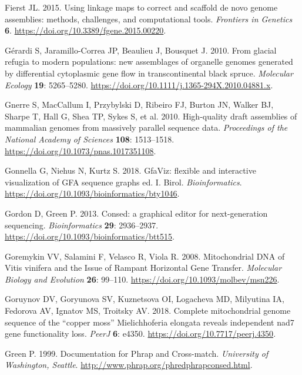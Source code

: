 \documentclass[
  12pt,
  oneside,
  openany]{book}
\begin{document}
\leavevmode\hypertarget{ref-Fierst_2015}{}%
Fierst JL. 2015. Using linkage maps to correct and scaffold de novo genome assemblies: methods, challenges, and computational tools. \emph{Frontiers in Genetics} \textbf{6}. \url{https://doi.org/10.3389/fgene.2015.00220}.

\leavevmode\hypertarget{ref-Gerardi_2010}{}%
Gérardi S, Jaramillo-Correa JP, Beaulieu J, Bousquet J. 2010. From glacial refugia to modern populations: new assemblages of organelle genomes generated by differential cytoplasmic gene flow in transcontinental black spruce. \emph{Molecular Ecology} \textbf{19}: 5265--5280. \url{https://doi.org/10.1111/j.1365-294X.2010.04881.x}.

\leavevmode\hypertarget{ref-Gnerre_2010}{}%
Gnerre S, MacCallum I, Przybylski D, Ribeiro FJ, Burton JN, Walker BJ, Sharpe T, Hall G, Shea TP, Sykes S, et al. 2010. High-quality draft assemblies of mammalian genomes from massively parallel sequence data. \emph{Proceedings of the National Academy of Sciences} \textbf{108}: 1513--1518. \url{https://doi.org/10.1073/pnas.1017351108}.

\leavevmode\hypertarget{ref-Gonnella_2018}{}%
Gonnella G, Niehus N, Kurtz S. 2018. GfaViz: flexible and interactive visualization of GFA sequence graphs ed. I. Birol. \emph{Bioinformatics}. \url{https://doi.org/10.1093/bioinformatics/bty1046}.

\leavevmode\hypertarget{ref-Gordon_2013}{}%
Gordon D, Green P. 2013. Consed: a graphical editor for next-generation sequencing. \emph{Bioinformatics} \textbf{29}: 2936--2937. \url{https://doi.org/10.1093/bioinformatics/btt515}.

\leavevmode\hypertarget{ref-Goremykin_2008}{}%
Goremykin VV, Salamini F, Velasco R, Viola R. 2008. Mitochondrial DNA of Vitis vinifera and the Issue of Rampant Horizontal Gene Transfer. \emph{Molecular Biology and Evolution} \textbf{26}: 99--110. \url{https://doi.org/10.1093/molbev/msn226}.

\leavevmode\hypertarget{ref-Goruynov_2018}{}%
Goruynov DV, Goryunova SV, Kuznetsova OI, Logacheva MD, Milyutina IA, Fedorova AV, Ignatov MS, Troitsky AV. 2018. Complete mitochondrial genome sequence of the ``copper moss'' Mielichhoferia elongata reveals independent nad7 gene functionality loss. \emph{PeerJ} \textbf{6}: e4350. \url{https://doi.org/10.7717/peerj.4350}.

\leavevmode\hypertarget{ref-Green_1999}{}%
Green P. 1999. Documentation for Phrap and Cross-match. \emph{University of Washington, Seattle}. \url{http://www.phrap.org/phredphrapconsed.html}.
\end{document}
